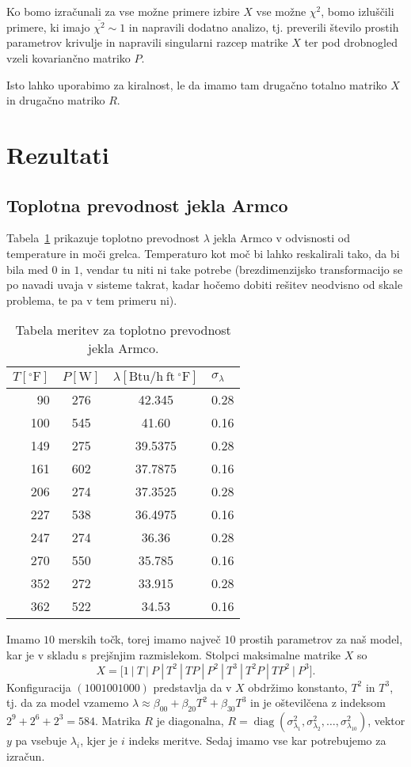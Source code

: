 \documentclass[a4 paper, 12pt]{article}
\newcommand{\diag}{
	\operatorname{diag}
}
\begin{document}
Ko bomo izra\v cunali za vse mo\v zne primere izbire $X$ vse mo\v zne $\chi^2$, bomo izlu\v s\v cili primere, ki imajo
$\overline{\chi^2} \sim 1$ in napravili dodatno analizo, tj. preverili \v stevilo prostih parametrov krivulje in
napravili singularni razcep matrike $X$ ter pod drobnogled vzeli kovarian\v cno matriko $P$.

Isto lahko uporabimo za kiralnost, le da imamo tam druga\v cno totalno matriko $X$ in druga\v cno matriko $R$.

\section{Rezultati}

\subsection{Toplotna prevodnost jekla Armco}
Tabela~\ref{tab1} prikazuje toplotno prevodnost $\lambda$ jekla Armco v odvisnosti od temperature in mo\v ci grelca.
Temperaturo kot mo\v c bi lahko reskalirali tako, da bi bila med $0$ in $1$, vendar tu niti ni take potrebe
(brezdimenzijsko transformacijo se po navadi uvaja v sisteme takrat, kadar ho\v cemo dobiti re\v sitev neodvisno od
skale problema, te pa v tem primeru ni).

\begin{table}[H]\centering
	\caption{Tabela meritev za toplotno prevodnost jekla Armco.}
	\begin{tabular}{r|c|c|l}
		$T [^\circ\mathrm{F}]$ & $P[\mathrm{W}]$ & $\lambda[\mathrm{Btu/h\ ft\ {}^\circ F}]$ & $\sigma_{\lambda}$ \\
		\hline
		90  & 276 & 42.345  & 0.28 \\
		100 & 545 & 41.60   & 0.16 \\
		149 & 275 & 39.5375 & 0.28 \\
		161 & 602 & 37.7875 & 0.16 \\
		206 & 274 & 37.3525 & 0.28 \\
		227 & 538 & 36.4975 & 0.16 \\
		247 & 274 & 36.36   & 0.28 \\
		270 & 550 & 35.785  & 0.16 \\
		352 & 272 & 33.915  & 0.28 \\
		362 & 522 & 34.53   & 0.16
	\end{tabular}
	\label{tab1}
\end{table}

Imamo $10$ merskih to\v ck, torej imamo najve\v c $10$ prostih parametrov za na\v s model, kar je v skladu s prej\v snjim
razmislekom. Stolpci maksimalne matrike $X$ so
\[
	X = \Big[1\ |\ T\ |\ P\ |\ T^2\ |\ TP\ |\ P^2\ |\ T^3\ |\ T^2P\ |\ TP^2\ |\ P^3 \Big].
\]
Konfiguracija $(1001001000)$ predstavlja da v $X$ obdr\v zimo konstanto, $T^2$ in $T^3$, tj. da za model vzamemo
$\lambda \approx \beta_{00} + \beta_{20} T^2 + \beta_{30} T^3$ in je o\v stevil\v cena z indeksom $2^9 + 2^6 + 2^3 = 584$.
Matrika $R$ je diagonalna, $R = \diag(\sigma_{\lambda_1}^2, \sigma_{\lambda_2}^2, \ldots, \sigma_{\lambda_{10}}^2)$,
vektor $y$ pa vsebuje $\lambda_i$, kjer je $i$ indeks meritve. Sedaj imamo vse kar potrebujemo za izra\v cun.
\end{document}
